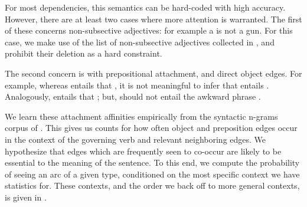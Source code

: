 For most dependencies, this semantics can be hard-coded with high accuracy.
However, there are at least two cases where more attention is warranted.
The first of these concerns non-subsective adjectives: for example 
  a  is not a gun.
For this case, we make use of the list of non-subsective adjectives collected
  in , and prohibit their deletion as a
  hard constraint.

The second concern is with prepositional attachment, and direct object
  edges.
For example, whereas  entails
  that , it is not meaningful to infer that
   entails .
Analogously,  
  entails that ; but,  should not entail the
  awkward phrase .

We learn these attachment affinities empirically from the syntactic n-grams
  corpus of .
This gives us counts for how often object and preposition edges occur in the
  context of the governing verb and relevant neighboring edges.
We hypothesize that edges which are frequently seen to co-occur 
  are likely
  to be essential to the meaning of the sentence.
To this end, we compute the probability of seeing an arc of a given type,
  conditioned on the most specific context we have statistics for.
These contexts, and the order we back off to more general contexts,
  is given in .

